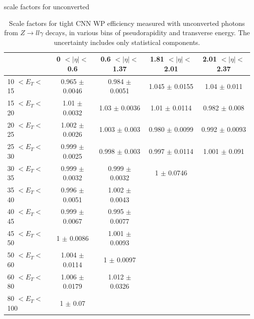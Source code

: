 \begin{frame}{scale factors for unconverted}
\begin{table}[htbp]
    \centering
   \begin{tabular}{lcccc}
   \hline\hline
     & 0 $ < |\eta| < $ 0.6 & 0.6 $ < |\eta| < $ 1.37 & 1.81 $ < |\eta| < $ 2.01  & 2.01 $ < |\eta| < $ 2.37 \\
    \hline
10 $ < E_T < $ 15   & 0.965 $\pm$ 0.0046 & 0.984 $\pm$ 0.0051 & 1.045 $\pm$ 0.0155 & 1.04 $\pm$ 0.011\\
15 $ < E_T < $ 20   & 1.01 $\pm$  0.0032 & 1.03 $\pm$ 0.0036  & 1.01 $\pm$ 0.0114 & 0.982 $\pm$ 0.008 \\
20 $ < E_T < $ 25   & 1.002 $\pm$ 0.0026 & 1.003 $\pm$ 0.003  & 0.980 $\pm$ 0.0099 & 0.992 $\pm$ 0.0093\\
25 $ < E_T < $ 30   & 0.999 $\pm$ 0.0025 & 0.998 $\pm$ 0.003  & 0.997 $\pm$ 0.0114 & 1.001 $\pm$ 0.091\\
30 $ < E_T < $ 35   & 0.999 $\pm$ 0.0032 & 0.999 $\pm$ 0.0032 & 1     $\pm$ 0.0746 & \\
35 $ < E_T < $ 40   & 0.996 $\pm$ 0.0051 & 1.002 $\pm$ 0.0043 &                    & \\
40 $ < E_T < $ 45   & 0.999 $\pm$ 0.0067 & 0.995 $\pm$ 0.0077 &                    & \\
45 $ < E_T < $ 50   & 1     $\pm$ 0.0086 & 1.001 $\pm$ 0.0093 &                    & \\
50 $ < E_T < $ 60   & 1.004 $\pm$ 0.0114 & 1     $\pm$ 0.0097 &                    & \\
60 $ < E_T < $ 80   & 1.006 $\pm$ 0.0179 & 1.012 $\pm$ 0.0326 &                    & \\
80 $ < E_T < $ 100  & 1     $\pm$ 0.07   &                    &                    & \\
\hline\hline
\end{tabular}
\caption{Scale factors for tight CNN WP efficiency measured with unconverted photons from $Z\rightarrow ll\gamma$ decays, in various bins of pseudorapidity and transverse energy. The uncertainty includes only statistical components.}
\end{table}
\end{frame}

